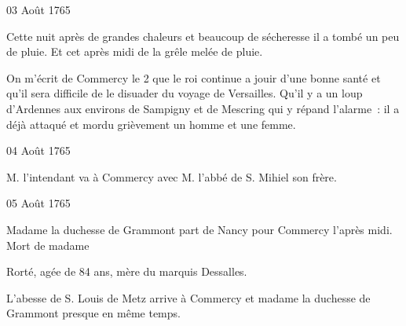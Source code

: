                      \begin{diary}{03 Août 1765}{}
                        
                         Cette nuit après de grandes chaleurs
                           et beaucoup de sécheresse il a tombé un
                           peu de pluie. Et cet après midi de la grêle
                           melée de pluie. \bigskip
        
        
                         On m'écrit de Commercy
                           le 2 que le
                              roi continue a jouir d'une bonne santé
                           et qu'il sera difficile de le disuader du
                           voyage de Versailles. Qu'il
                           y a un loup
                           d'Ardennes aux environs de Sampigny et
                           de Mescring qui y répand l'alarme : il a
                           déjà attaqué et mordu grièvement un homme
                           et une femme. \bigskip
        
        
                     \end{diary}

                     \begin{diary}{04 Août 1765}{}
                        
                        
                           M. l'intendant va à Commercy avec M.
                              l'abbé de S. Mihiel son frère. \bigskip
        
        
                     \end{diary}

                     \begin{diary}{05 Août 1765}{}
                        
                        
                           Madame la duchesse de Grammont part de
                           Nancy pour Commercy l'après midi.
                           Mort de madame
                              
                              Rorté, agée de 84 ans, mère du marquis Dessalles. \bigskip
        
        
                        
                           L'abesse de S. Louis de Metz
                           arrive à Commercy
                           et madame la duchesse de Grammont presque en
                           même temps. \bigskip
        
        
                     \end{diary}

